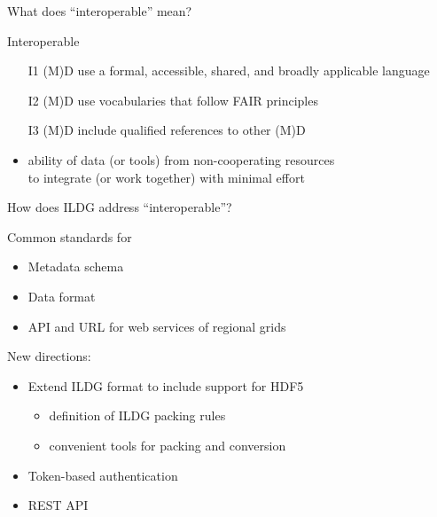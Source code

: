 \documentclass[aspectratio=169,xcolor=dvipsnames]{beamer}
\begin{document}
\begin{frame}{What does ``interoperable'' mean?}
  \begin{alertblock}{Interoperable}
    \begin{itemize}
    \item[I1] (M)D use a formal, accessible, shared, and broadly applicable 
      language %
    \item[I2] (M)D use vocabularies that follow FAIR principles
    \item[I3] (M)D include qualified references to other (M)D
    \end{itemize}
  \end{alertblock}

  \begin{itemize}
  \item ability of data (or tools) from non-cooperating resources\\
    to integrate (or work together) with minimal effort
    
  \end{itemize}
\end{frame}
\begin{frame}{How does ILDG address ``interoperable''?}

  \begin{block}{Common standards for}
    \begin{itemize}
    \item Metadata schema
    \item Data format
    \item API and URL for web services of regional grids
    \end{itemize}
  \end{block}

  New directions:
  \begin{itemize}
  \item Extend ILDG format to include support for \alert{HDF5}
    \begin{itemize}
    \item definition of ILDG packing rules
    \item convenient tools for packing and conversion
    \end{itemize}
  \item Token-based authentication
  \item REST API
  \end{itemize}
  
\end{frame}
\end{document}
